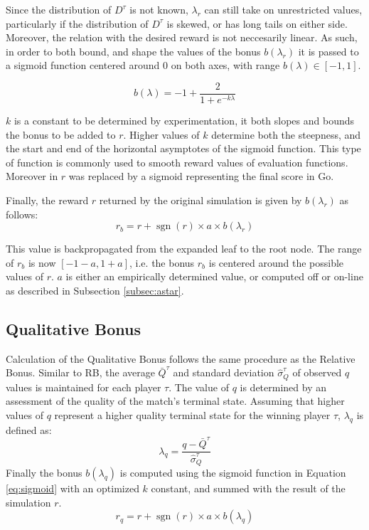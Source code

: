 \documentclass{ecai2014}
\newcommand{\sgn}{\mathop{\mathrm{sgn}}}
\begin{document}
Since the distribution of $D^\tau$ is not known, $\lambda_r$ can still take on unrestricted values, particularly if the distribution of $D^\tau$ is skewed, or has long tails on either side. Moreover, the relation with the desired reward is not neccesarily linear. As such, in order to both bound, and shape the values of the bonus $b(\lambda_r)$ it is passed to a sigmoid function centered around $0$ on both axes, with range $b(\lambda) \in [-1, 1]$. 

\begin{equation}
b(\lambda)=-1+\frac{2}{1+e^{-k\lambda}}
\label{eq:sigmoid}
\end{equation}

$k$ is a constant to be determined by experimentation, it both slopes and bounds the bonus to be added to $r$. Higher values of $k$ determine both the steepness, and the start and end of the horizontal asymptotes of the sigmoid function. This type of function is commonly used to smooth reward values of evaluation functions. Moreover in \cite{shibahara2008combining} $r$ was replaced by a sigmoid representing the final score in Go.

Finally, the reward $r$ returned by the original simulation is given by $b(\lambda_r)$ as follows:
\begin{equation}
r_b=r+\sgn(r)\times a \times b(\lambda_r)
\label{eq:rb}
\end{equation}

This value is backpropagated from the expanded leaf to the root node. The range of $r_b$ is now $[-1-a, 1+a]$, i.e. the bonus $r_b$ is centered around the possible values of $r$. $a$ is either an empirically determined value, or computed off or on-line as described in Subsection \ref{subsec:astar}.

\subsection{Qualitative Bonus}
\label{subsec:qb}
Calculation of the Qualitative Bonus follows the same procedure as the Relative Bonus. Similar to RB, the average $\bar{Q}^\tau$ and standard deviation $\hat{\sigma}^\tau_Q$ of observed $q$ values is maintained for each player $\tau$. The value of $q$ is determined by an assessment of the quality of the match's terminal state. Assuming that higher values of $q$ represent a higher quality terminal state for the winning player $\tau$, $\lambda_q$ is defined as:
\begin{equation}
\lambda_q = \frac{q - \bar{Q}^\tau}{\hat{\sigma}^\tau_Q}
\label{eq:qb_norm}
\end{equation}
Finally the bonus $b(\lambda_q)$ is computed using the sigmoid function in Equation \ref{eq:sigmoid} with an optimized $k$ constant, and summed with the result of the simulation $r$.
\begin{equation}
r_q=r+\sgn(r)\times a \times b(\lambda_q)
\label{eq:qb}
\end{equation}
\end{document}
